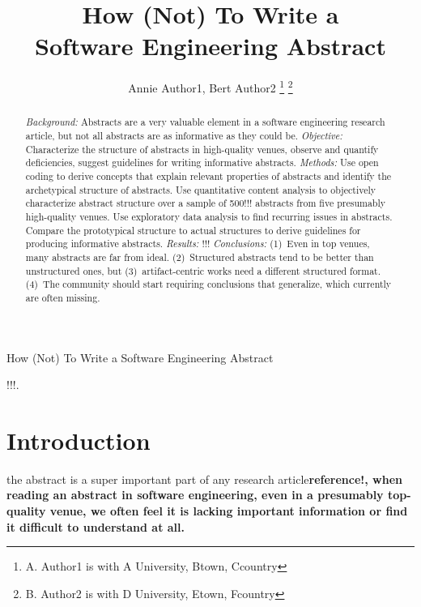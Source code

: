 \documentclass[10pt,journal,compsoc]{IEEEtran}
\newcommand{\Todo}[1]{\bgroup\bf\Large #1\egroup}
\begin{document}
	
\title{How (Not) To Write a\\Software Engineering Abstract}

\author{Annie Author1, Bert Author2
\thanks{A. Author1 is with A University, Btown, Ccountry}
\thanks{B. Author2 is with D University, Etown, Fcountry}}

%
{How (Not) To Write a Software Engineering Abstract}

\maketitle

\begin{abstract}  %
\emph{Background:}
Abstracts are a very valuable element in a software engineering research article,
but not all abstracts are as informative as they could be.
\emph{Objective:} 
Characterize the structure of abstracts in high-quality venues, 
observe and quantify deficiencies, 
suggest guidelines for writing informative abstracts.
\emph{Methods:}
Use open coding to derive concepts that explain relevant properties of abstracts
and identify the archetypical structure of abstracts.
Use quantitative content analysis to objectively characterize abstract structure
over a sample of 500!!! abstracts from five presumably high-quality venues.
Use exploratory data analysis to find recurring issues in abstracts.
Compare the prototypical structure to actual structures to derive
guidelines for producing informative abstracts.
\emph{Results:}
!!!
\emph{Conclusions:}
(1)~Even in top venues, many abstracts are far from ideal.
(2)~Structured abstracts tend to be better than unstructured ones, 
but (3)~artifact-centric works need a different structured format.
(4)~The community should start requiring conclusions that generalize, 
which currently are often missing.
\end{abstract}

\begin{IEEEkeywords}
!!!.
\end{IEEEkeywords}


\section{Introduction}
 the abstract is a super important part of any research article\Todo{reference!},
when reading an abstract in software engineering, even in a presumably top-quality venue,
we often feel it is lacking important information or find it difficult to understand at all.
\end{document}
